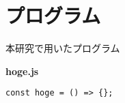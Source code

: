 \chapter{プログラム}
\thispagestyle{fancy}

本研究で用いたプログラム

{\bf hoge.js}

\begin{lstlisting}
const hoge = () => {};
\end{lstlisting}
